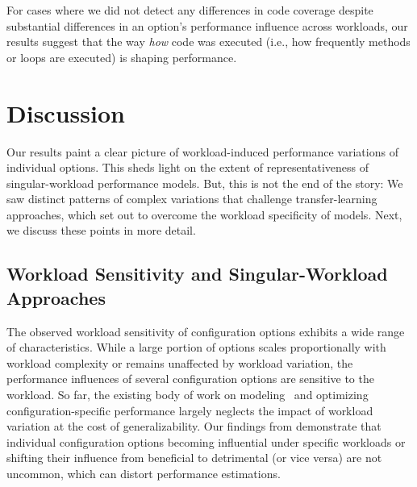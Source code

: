 {{{For cases where we did not detect any differences in code coverage despite substantial differences in an option's performance influence across workloads, our results suggest that the way \emph{how} code was executed (i.e., how frequently methods or loops are executed) is shaping performance.

\color{black}
\section{Discussion}
Our results paint a clear picture of workload-induced performance variations of individual options. This sheds light on the extent of representativeness of singular-workload performance models. But, this is not the end of the story: We saw distinct patterns of complex variations that challenge transfer-learning approaches, which set out to overcome the workload specificity of models. Next, we discuss these points in more detail.


\subsection{Workload Sensitivity and Singular-Workload Approaches}
The observed workload sensitivity of configuration options exhibits a wide range of characteristics. While a large portion of options scales proportionally with workload complexity or remains unaffected by workload variation, the performance influences of several configuration options are sensitive to the workload.  So far, the existing body of work on modeling~\cite{dorn2020,siegmundPerformanceinfluenceModelsHighly2015,haDeepPerf2019,perfAL,guoVariabilityawarePerformancePrediction2013,sarkarCostEfficientSamplingPerformance,guo_2018_data,fourier_learning_2015,perLasso} and optimizing~\cite{chen_mmo_2021,nairUsingBadLearners2017,nairFlash18,ohFindingNearoptimalConfigurations2017} configuration-specific performance largely neglects the impact of workload variation at the cost of generalizability. 
Our findings from  demonstrate that individual configuration options becoming influential under specific workloads or shifting their influence from beneficial to detrimental (or vice versa) are not uncommon, which can distort performance estimations.

}}}

